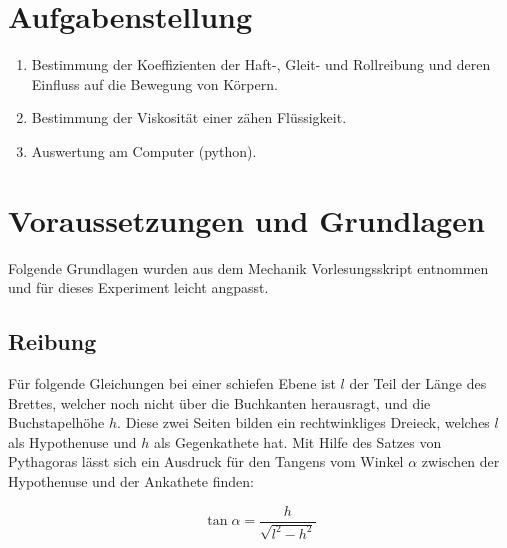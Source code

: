 \documentclass[11pt,ngerman]{scrartcl}
\begin{document}

\tableofcontents
\newpage
\section{Aufgabenstellung}
\label{sec:aufgabenstellung} 

\begin{enumerate}
    \item  Bestimmung der Koeffizienten der Haft-, Gleit- und Rollreibung
        und deren Einfluss auf die Bewegung von Körpern.
    \item Bestimmung der Viskosität einer zähen Flüssigkeit.
    \item Auswertung am Computer (python).
\end{enumerate}

\section{Voraussetzungen und Grundlagen} \label{sec:voraussetzungen_grundlagen}
Folgende Grundlagen wurden aus dem Mechanik Vorlesungsskript \cite{Knoll2020}
entnommen und für dieses Experiment leicht angpasst.

\subsection{Reibung}

Für folgende Gleichungen bei einer schiefen Ebene ist
$l$ der Teil der Länge des Brettes, welcher noch nicht über die Buchkanten
herausragt, und die Buchstapelhöhe $h$. Diese zwei Seiten bilden
ein rechtwinkliges Dreieck, welches $l$ als Hypothenuse und $h$
als Gegenkathete hat. Mit Hilfe des Satzes von Pythagoras lässt
sich ein Ausdruck für den Tangens vom Winkel $\alpha$ zwischen der Hypothenuse
und der Ankathete finden:

\begin{equation}
    \tan{\alpha} = \frac{h}{\sqrt{l^2-h^2}} \label{eq:tangens}
\end{equation}
\end{document}
